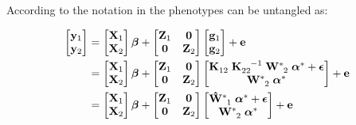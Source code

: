 \documentclass[12pt,titlepage]{article}
\begin{document}
According to the notation in  the phenotypes can be
untangled as:

\begin{align} \label{eq:entangled-augmented-single-step-model}
\begin{bmatrix}
  \mathbf{y}_1 \\
  \mathbf{y}_2
 \end{bmatrix}
& =
 \begin{bmatrix}
  \mathbf{X}_1 \\
  \mathbf{X}_2
 \end{bmatrix}
 \boldsymbol{\beta} +
 \begin{bmatrix}
  \mathbf{Z}_1 & \boldsymbol{0} \\
  \boldsymbol{0} & \mathbf{Z}_2
 \end{bmatrix}
\begin{bmatrix}
  \mathbf{g}_1 \\
  \mathbf{g}_2
 \end{bmatrix}
  + \mathbf{e} \\
    & =
 \begin{bmatrix}
 \mathbf{X}_1 \\
 \mathbf{X}_2
 \end{bmatrix}
 \boldsymbol{\beta} +
 \begin{bmatrix}
  \mathbf{Z}_1 & \boldsymbol{0} \\
  \boldsymbol{0} & \mathbf{Z}_2
 \end{bmatrix}
\begin{bmatrix}
  \tensor[]{\mathbf{K}}{_{12}} \; \tensor[]{\mathbf{K}}{_{22}^{-1}} \;
  \tensor[]{\mathbf{W}}{^{*}_{2}} \;
  \tensor[]{\boldsymbol{\alpha}}{^{*}} + \boldsymbol{\epsilon}  \\
  \tensor[]{\mathbf{W}}{^{*}_{2}} \; \tensor[]{\boldsymbol{\alpha}}{^{*}} \\
 \end{bmatrix}
  + \mathbf{e} \\
    & =
 \begin{bmatrix}
  \mathbf{X}_1 \\
  \mathbf{X}_2
 \end{bmatrix}
 \boldsymbol{\beta} +
 \begin{bmatrix}
  \mathbf{Z}_1 & \boldsymbol{0} \\
  \boldsymbol{0} & \mathbf{Z}_2
 \end{bmatrix}
\begin{bmatrix}
  \tensor[]{\mathbf{\hat{W}}}{^{*}_{1}} \;
  \tensor[]{\boldsymbol{\alpha}}{^{*}} + \boldsymbol{\epsilon} \\
  \tensor[]{\mathbf{W}}{^{*}_{2}} \; \tensor[]{\boldsymbol{\alpha}}{^{*}} \\
 \end{bmatrix}
  + \mathbf{e} \\
\end{align}
\end{document}
